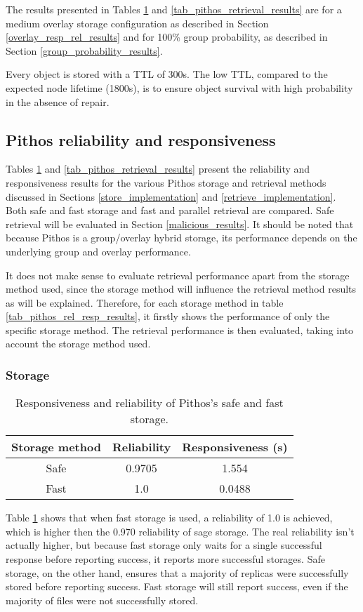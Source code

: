 The results presented in Tables \ref{tab_pithos_storage_results} and \ref{tab_pithos_retrieval_results} are for a medium overlay storage configuration as described in Section \ref{overlay_resp_rel_results} and for 100\% group probability, as described in Section \ref{group_probability_results}.

Every object is stored with a TTL of 300s. The low TTL, compared to the expected node lifetime (1800s), is to ensure object survival with high probability in the absence of repair.

\subsection{Pithos reliability and responsiveness}
\label{pithos_resp_rel_results}

Tables \ref{tab_pithos_storage_results} and \ref{tab_pithos_retrieval_results} present the reliability and responsiveness results for the various Pithos storage and retrieval methods discussed in Sections \ref{store_implementation} and \ref{retrieve_implementation}.
Both safe and fast storage and fast and parallel retrieval are compared. Safe retrieval will be evaluated in Section \ref{malicious_results}. It should be noted that because Pithos is a group/overlay hybrid storage, its performance depends on the underlying group and overlay performance.

It does not make sense to evaluate retrieval performance apart from the storage method used, since the storage method will influence the retrieval method results as will be explained. Therefore, for each storage method in table \ref{tab_pithos_rel_resp_results}, it firstly shows the performance of only the specific storage method. The retrieval performance is then evaluated, taking into account the storage method used.

\subsubsection{Storage}
\begin{table}[htbp]
\centering
\begin{tabular}{|c|c|c|}
\hline
Storage method & Reliability & Responsiveness (s)\\
\hline
Safe    &  0.9705  &   1.554  \\
Fast    &  1.0     &   0.0488 \\
\hline
\end{tabular}
\caption{Responsiveness and reliability of Pithos's safe and fast storage.}
\label{tab_pithos_storage_results}
\end{table}
%
Table \ref{tab_pithos_storage_results} shows that when fast storage is used, a reliability of 1.0 is achieved, which is higher then the 0.970 reliability of sage storage. The real reliability isn't actually higher, but because fast storage only waits for a single successful response before reporting success, it reports more successful storages. Safe storage, on the other hand, ensures that a majority of replicas were successfully stored before reporting success. Fast storage will still report success, even if the majority of files were not successfully stored.

